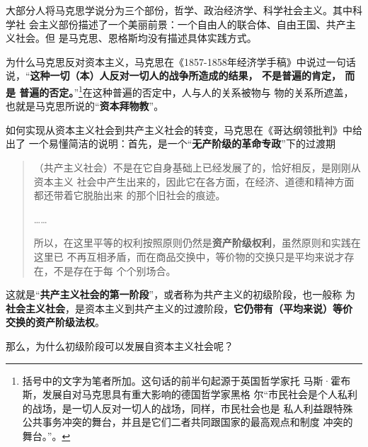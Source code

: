 大部分人将马克思学说分为三个部份，哲学、政治经济学、科学社会主义。其中科学社
会主义部份描述了一个美丽前景：一个自由人的联合体、自由王国、共产主义社会。但
是马克思、恩格斯均没有描述具体实践方式。

为什么马克思反对资本主义，马克思在《1857-1858年经济学手稿》中说过一句话
说，“\textbf{这种一切（本）人反对一切人的战争所造成的结果， 不是普遍的肯定， 而是
  普遍的否定。}”\footnote{括号中的文字为笔者所加。这句话的前半句起源于英国哲学家托
  马斯·霍布斯\cite[531]{karlvol46a}，发展自对马克思具有重大影响的德国哲学家黑格
  尔“市民社会是个人私利的战场，是一切人反对一切人的战场，同样，市民社会也是
  私人利益跟特殊公共事务冲突的舞台，并且是它们二者共同跟国家的最高观点和制度
  冲突的舞台。”\cite[309]{hegelyuanli}。}在这种普遍的否定中，人与人的关系被物与
物的关系所遮盖，也就是马克思所说的“\textbf{资本拜物教}”。

如何实现从资本主义社会到共产主义社会的转变，马克思在《哥达纲领批判》中给出了
一个易懂简洁的说明：首先，是一个“\textbf{无产阶级的革命专政}”下的过渡期
\begin{quotation}
  （共产主义社会）不是在它自身基础上已经发展了的，恰好相反，是刚刚从资本主义
  社会中产生出来的，因此它在各方面，在经济、道德和精神方面都还带着它脱胎出来
  的那个旧社会的痕迹。

  ……

  所以，在这里平等的权利按照原则仍然是\textbf{资产阶级权利}，虽然原则和实践在这里已
  不再互相矛盾，而在商品交换中，等价物的交换只是平均来说才存在，不是存在于每
  个个别场合。\cite[434]{maenwen3}
\end{quotation}

这就是“\textbf{共产主义社会的第一阶段}”，或者称为共产主义的初级阶段，也一般称
为\textbf{社会主义社会}，是资本主义到共产主义的过渡阶段，\textbf{它仍带有（平均来说）等价
  交换的资产阶级法权}。

那么，为什么初级阶段可以发展自资本主义社会呢？



